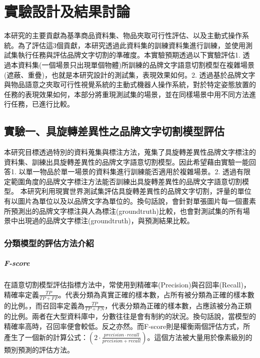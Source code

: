\chapter{實驗設計及結果討論}
\label{chapter:experiment}

本研究的主要貢獻為基準商品資料集、物品夾取可行性評估、以及主動式操作系統。為了評估這3個貢獻，本研究透過此資料集的訓練資料集進行訓練，並使用測試集執行任務與評估品牌文字切割的準確度。本實驗預期透過以下實驗評估1. 透過本資料集(一個場景只出現單個物體)所訓練的品牌文字語意切割模型在複雜場景(遮蔽、重疊)，也就是本研究設計的測試集，表現效果如何。2. 透過基於品牌文字與物品語意之夾取可行性視覺系統的主動式機器人操作系統，對於特定姿態放置的任務的表現效果如何，本部分將重現測試集的場景，並在同樣場景中用不同方法進行任務，已進行比較。

\section{實驗一、具旋轉差異性之品牌文字切割模型評估}
本研究目標透過特別的資料蒐集與標注方法，蒐集了具旋轉差異性品牌文字標注的資料集、訓練出具旋轉差異性的品牌文字語意切割模型。因此希望藉由實驗一能回答1. 以單一物品於單一場景的資料集進行訓練能否適用於複雜場景。2. 透過有限定範圍角度的品牌文字標注方法能否訓練出具旋轉差異性的品牌文字語意切割模型。
本研究利用現實世界測試集評估具旋轉差異性的品牌文字切割，評量的單位有以圖片為單位以及以品牌文字為單位的。換句話說，會針對單張圖片每一個畫素所預測出的品牌文字標注與人為標注(groundtruth)比較，也會對測試集的所有場景中出現過的品牌文字標注(groundtruth)，與預測結果比較。


\subsection{分類模型的評估方法介紹}

\paragraph{F-score}
在語意切割模型評估指標方法中，常使用到精確率(Precision)與召回率(Recall)，精確率定義$\frac{TP}{TP + FP}$。代表分類為真實正確的樣本數，占所有被分類為正確的樣本數的比例。，而召回率定義為$\frac{TP}{TP + FN}$，代表分類為正確的樣本數，占應該被分為正類的比例。兩者在大型資料庫中，分數往往是會有制約的狀況。換句話說，當模型的精確率高時，召回率便會較低。反之亦然。而F-score則是權衡兩個評估方式，所產生了一個新的計算公式：$(2 \cdot \frac{precision\cdot recall}{precision+recall})$。這個方法被大量用於像素級別的類別預測的評估方法。

